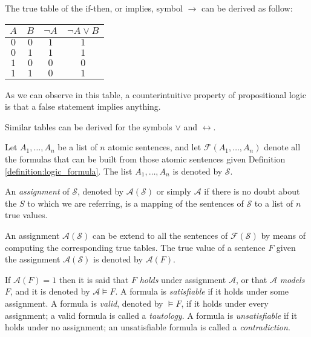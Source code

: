 \begin{example}
The true table of the if-then, or implies, symbol $\rightarrow$ can be derived as follow:
\begin{center}
\begin{tabular}{ c | c | c | c }
 $A$ & $B$ & $\lnot A$ & $\lnot A \lor B$ \\
 \hline
 $0$ & $0$ & $1$ & $1$ \\
 $0$ & $1$ & $1$ & $1$ \\
 $1$ & $0$ & $0$ & $0$ \\
 $1$ & $1$ & $0$ & $1$
\end{tabular}
\end{center}
As we can observe in this table, a counterintuitive property of propositional logic is that a false statement implies anything.
\end{example}

Similar tables can be derived for the symbols $\lor$ and $\leftrightarrow$.

Let $A_1, \ldots, A_n$ be a list of $n$ atomic sentences, and let $\mathcal{F}(A_1, \ldots, A_n)$ denote all the formulas that can be built from those atomic sentences given Definition \ref{definition:logic_formula}. The list $A_1, \ldots, A_n$ is denoted by $\mathcal{S}$.

\begin{definition}
An \emph{assignment} of $\mathcal{S}$, denoted by $\mathcal{A}(\mathcal{S})$ or simply $\mathcal{A}$ if there is no doubt about the $S$ to which we are referring, is a mapping of the sentences of $\mathcal{S}$ to a list of $n$ true values. 
\end{definition}

An assignment $\mathcal{A}(\mathcal{S})$ can be extend to all the sentences of $\mathcal{F}(\mathcal{S})$ by means of computing the corresponding true tables. The true value of a sentence $F$ given the assignment $\mathcal{A}(\mathcal{S})$ is denoted by $\mathcal{A}(F)$.

\begin{definition}
If $\mathcal{A}(F)=1$ then it is said that $F$ \emph{holds} under assignment $\mathcal{A}$, or that $\mathcal{A}$ \emph{models} $F$, and it is denoted by $\mathcal{A} \models F$. A formula is \emph{satisfiable} if it holds under some assignment. A formula is \emph{valid}, denoted by $\models F$, if it holds under every assignment; a valid formula is called a \emph{tautology}. A formula is \emph{unsatisfiable} if it holds under no assignment; an unsatisfiable formula is called a \emph{contradiction}.
\end{definition}

